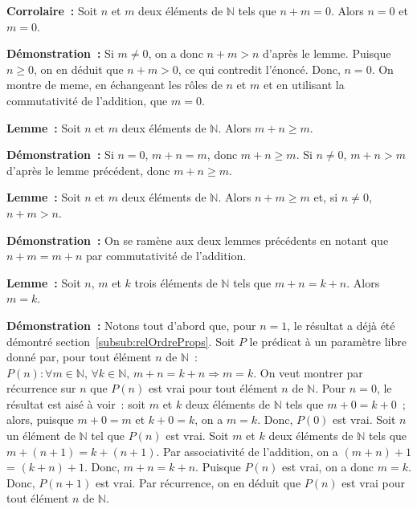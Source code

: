    \done 

\medskip

\noindent\textbf{Corrolaire :} Soit $n$ et $m$ deux éléments de $\mathbb{N}$ tels que $n + m = 0$. Alors $n = 0$ et $m = 0$. 

\medskip

\noindent\textbf{Démonstration :} 
    Si $m \neq 0$, on a donc $n + m > n$ d'après le lemme. Puisque $n \geq 0$, on en déduit que $n + m > 0$, ce qui contredit l'énoncé. 
    Donc, $n = 0$.
    On montre de meme, en échangeant les rôles de $n$ et $m$ et en utilisant la commutativité de l'addition, que $m = 0$.

   \done 

\medskip

\noindent\textbf{Lemme :} Soit $n$ et $m$ deux éléments de $\mathbb{N}$. Alors $m+n \geq m$. 

\medskip

\noindent\textbf{Démonstration :} 
    Si $n=0$, $m+n=m$, donc $m+n \geq m$. 
    Si $n \neq 0$, $m+n > m$ d'après le lemme précédent, donc $m+n \geq m$.
    
   \done 

\medskip

\noindent\textbf{Lemme :} Soit $n$ et $m$ deux éléments de $\mathbb{N}$. Alors $n+m \geq m$ et, si $n \neq 0$, $n+m > n$. 

\medskip

\noindent\textbf{Démonstration :} 
    On se ramène aux deux lemmes précédents en notant que $n+m=m+n$ par commutativité de l'addition.
    
   \done 

\medskip

\noindent\textbf{Lemme :} Soit $n$, $m$ et $k$ trois éléments de $\mathbb{N}$ tels que $m+n=k+n$. Alors  $m=k$.

\medskip

\noindent\textbf{Démonstration :} 
    Notons tout d'abord que, pour $n=1$, le résultat a déjà été démontré section~\ref{subsub:relOrdreProps}.
    Soit $P$ le prédicat à un paramètre libre donné par, pour tout élément $n$ de $\mathbb{N}$ : $P(n): \forall m \in \mathbb{N}, \, \forall k \in \mathbb{N}, \, m+n=k+n \Rightarrow m=k$.
    On veut montrer par récurrence sur $n$ que $P(n)$ est vrai pour tout élément $n$ de $\mathbb{N}$. 
    Pour $n=0$, le résultat est aisé à voir : soit $m$ et $k$ deux éléments de $\mathbb{N}$ tels que $m+0=k+0$ ; alors, puisque $m+0=m$ et $k+0=k$, on a $m=k$. 
    Donc, $P(0)$ est vrai.
    Soit $n$ un élément de $\mathbb{N}$ tel que $P(n)$ est vrai. 
    Soit $m$ et $k$ deux éléments de $\mathbb{N}$ tels que $m+(n+1) = k+(n+1)$. 
    Par associativité de l'addition, on a $(m+n)+1$ = $(k+n)+1$. 
    Donc, $m+n=k+n$. 
    Puisque $P(n)$ est vrai, on a donc $m=k$. 
    Donc, $P(n+1)$ est vrai. 
    Par récurrence, on en déduit que $P(n)$ est vrai pour tout élément $n$ de $\mathbb{N}$.

